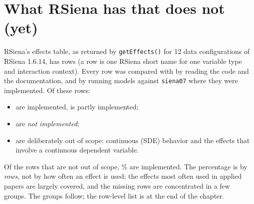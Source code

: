 \section{What RSiena has that \nwsaom{} does not (yet)}\label{sec:notimpl}
RSiena's effects table, as returned by \texttt{getEffects()} for 12 data configurations of RSiena 1.6.14, has \nTotal{} rows (a row is one RSiena short name for one variable type and interaction context). Every row was compared with \nwsaom{} by reading the code and the documentation, and by running models against \texttt{siena07} where they were implemented. Of these rows:
\begin{itemize}
\item \nImpl{} are implemented, \nPartial{} is partly implemented;
\item \nNotImpl{} are \emph{not implemented};
\item \nNotPlanned{} are deliberately out of scope: continuous (SDE) behavior and the effects that involve a continuous dependent variable.
\end{itemize}
Of the \nPlannable{} rows that are not out of scope, \pctImpl\% are implemented. The percentage is by \emph{rows}, not by how often an effect is used: the effects most often used in applied papers are largely covered, and the missing rows are concentrated in a few groups. The groups follow; the row-level list is at the end of the chapter.

